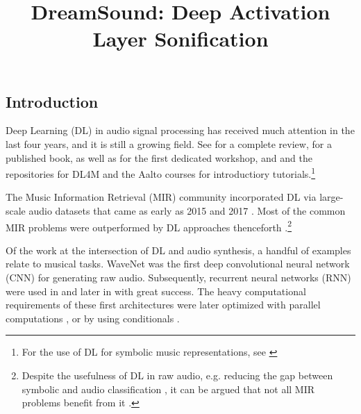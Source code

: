 \documentclass[a4paper,10pt,oneside]{article}
\title{DreamSound: Deep Activation Layer Sonification}
\begin{document}
\ninept
\maketitle

\begin{sloppy}
\begin{abstract}

\end{abstract}

\section{Introduction}
\label{sec:intro}

Deep Learning (DL) in audio signal processing has received much attention in the last four years, and it is still a growing field. See \cite{2019Purwins} for a complete review, \cite{Briot2017} for a published book, as well as\cite{herremans2017proceedings} for the first dedicated workshop, and \cite{choi2017tutorial} and the repositories for DL4M \cite{Bayle2017} and the Aalto courses \cite{Koray2018} for introductiory tutorials.\footnote{For the use of DL for symbolic music representations, see \cite{yang2017midinet, Briot2018AnET, rachel_manzelli_2018_1492375, hao_wen_dong_2018_1492377, mittal2021symbolic, MuseGanPapers}} 

The Music Information Retrieval (MIR) community incorporated DL via large-scale audio datasets that came as early as 2015 and 2017 \cite{2015piczak,2017audioset,engel2017neural}. Most of the common MIR problems were outperformed by DL approaches thenceforth \cite{2019Purwins}.\footnote{Despite the usefulness of DL in raw audio, e.g. reducing the gap between symbolic and audio classification \cite{sergio_oramas_2017_1417427}, it can be argued that not all MIR problems benefit from it \cite{harsh_verma_2019_3527866}. } 

Of the work at the intersection of DL and audio synthesis, a handful of examples relate to musical tasks. WaveNet \cite{oord2016wavenet} was the first deep convolutional neural network (CNN) for generating raw audio. Subsequently, recurrent neural networks (RNN) were used in \cite{mehri2017samplernn} and later in \cite{kalchbrenner2018efficient} with great success. The heavy computational requirements of these first architectures were later optimized with parallel computations \cite{oord2017parallel,yamamoto2020parallel,song2021improved}, or by using conditionals \cite{lamtharn_hantrakul_2019_3527860}. 


\end{sloppy}
\end{document}
